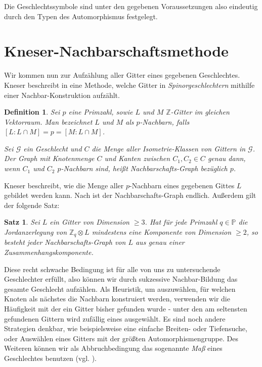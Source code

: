 \documentclass[12pt,a4paper,halfparskip,headsepline,bibtotocnumbered]{scrreprt}
\theoremstyle{nummermitklammern}
\newtheorem{definition}[defsatzusw]{Definition}
\newtheorem{satz}[defsatzusw]{Satz}
\theoremstyle{nonumberbreak}
\newcommand{\Z}{\mathbb{Z}}
\renewcommand{\P}{\mathbb{P}}
\begin{document}
Die Geschlechtssymbole sind unter den gegebenen Voraussetzungen also eindeutig durch den Typen des Automorphismus festgelegt.

\section{Kneser-Nachbarschaftsmethode}

Wir kommen nun zur Aufzählung aller Gitter eines gegebenen Geschlechtes. Kneser beschreibt in \cite[Abschnitt 28]{kneser} eine Methode, welche Gitter in \textit{Spinorgeschlechtern} mithilfe einer Nachbar-Konstruktion aufzählt.

\begin{framed}
	\begin{definition}
		Sei $p$ eine Primzahl, sowie $L$ und $M$ $\Z$-Gitter im gleichen Vektorraum. Man bezeichnet $L$ und $M$ als \textit{$p$-Nachbarn}, falls $\left[ L : L \cap M \right] = p = \left[ M : L \cap M \right]$.\par
		Sei $\mathcal{G}$ ein Geschlecht und $C$ die Menge aller Isometrie-Klassen von Gittern in $\mathcal{G}$. Der Graph mit Knotenmenge $C$ und Kanten zwischen $C_1, C_2 \in C$ genau dann, wenn $C_1$ und $C_2$ $p$-Nachbarn sind, heißt \textit{Nachbarschafts-Graph} bezüglich $p$.
	\end{definition}
\end{framed}

Kneser beschreibt, wie die Menge aller $p$-Nachbarn eines gegebenen Gittes $L$ gebildet werden kann.  Nach \cite{scharlau} ist der Nachbarschafts-Graph endlich. Außerdem gilt der folgende Satz:

\begin{framed}
	\begin{satz}
		Sei $L$ ein Gitter von Dimension $\geq 3$. Hat für jede Primzahl $q \in \P$ die Jordanzerlegung von $\Z_q \otimes L$ mindestens eine Komponente von Dimension $\geq 2$, so besteht jeder Nachbarschafts-Graph von $L$ aus genau einer Zusammenhangskomponente.
	\end{satz}
\end{framed}

Diese recht schwache Bedingung ist für alle von uns zu untersuchende Geschlechter erfüllt, also können wir durch sukzessive Nachbar-Bildung das gesamte Geschlecht aufzählen. Als Heuristik, um auszuwählen, für welchen Knoten als nächstes die Nachbarn konstruiert werden, verwenden wir die Häufigkeit mit der ein Gitter bisher gefunden wurde - unter den am seltensten gefundenen Gittern wird zufällig eines ausgewählt. Es sind noch andere Strategien denkbar, wie beispielsweise eine einfache Breiten- oder Tiefensuche, oder Auswählen eines Gitters mit der größten Automorphismengruppe. Des Weiteren können wir als Abbruchbedingung das sogenannte \textit{Maß} eines Geschlechtes benutzen (vgl. \cite[Abschnitt 35]{kneser}).
\end{document}
